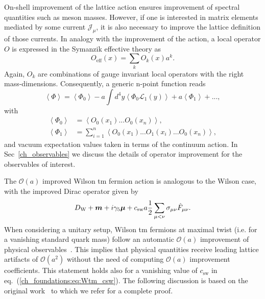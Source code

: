 On-shell improvement of the lattice action ensures improvement of spectral quantities such as meson masses. However, if one is interested in matrix elements mediated by some current $\mathcal{J}_{\mu}$, it is also necessary to improve the lattice definition of those currents. In analogy with the improvement of the action, a local operator $O$ is expressed in the Symanzik effective theory as
\begin{equation}
O_{\textrm{eff}}(x)=\sum_kO_k(x)a^k.
\end{equation}
Again, $O_k$ are combinations of gauge invariant local operators with the right mass-dimensions. Consequently, a generic n-point function reads
\begin{equation}
\label{ch_foundation:eq:Oimpr}
\left<\Phi\right>=\left<\Phi_0\right>-a\int d^4y\left<\Phi_0\mathcal{L}_1(y)\right>+a\left<\Phi_1\right>+...,
\end{equation}
with 
\begin{align}
\left<\Phi_0\right>&=\left<O_0(x_1)...O_0(x_n)\right>, \\
\left<\Phi_1\right>&=\sum_{i=1}^n\left<O_0(x_1)...O_1(x_i)...O_0(x_n)\right>,
\end{align}
and vacuum expectation values taken in terms of the continuum action. In Sec~\ref{ch_observables} we discuss the details of operator improvement for the observables of interest.

The $\mathcal{O}(a)$ improved Wilson tm fermion action is analogous to the Wilson case, with the improved Dirac operator given by 
\begin{equation}
\label{ch_foundations:eq:Wtm_csw}
D_{\textrm W}+\boldsymbol{m}+i\gamma_5\boldsymbol{\mu}+c_{\textrm{sw}}a\frac{1}{2}\sum_{\mu<\nu}\sigma_{\mu\nu}\hat{F}_{\mu\nu}.
\end{equation}
When considering a unitary setup,  Wilson tm fermions 
at maximal twist (i.e. for a vanishing standard quark mass) follow
an automatic $\mathcal{O}(a)$ improvement of physical observables~\citep{Frezzotti:2003ni,Shindler:2007vp}. This implies  that physical quantities receive leading lattice artifacts of $\mathcal{O}(a^2)$ 
 without the need of computing $\mathcal{O}(a)$ improvement coefficients. This statement holds also for a vanishing value of $c_{\textrm{sw}}$ in eq.~(\ref{ch_foundations:eq:Wtm_csw}). The following discussion is based on the original work~\citep{Frezzotti:2003ni} to which we refer for a complete proof.

